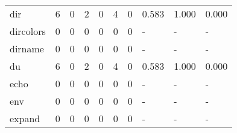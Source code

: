 \begin{longtable}{lp{2.0cm}p{2.0cm}p{2.0cm}p{2.0cm}p{2.0cm}p{2.0cm}p{2.0cm}p{2.0cm}p{2.0cm}}
dir       &                      6 &                                             0 &                                            2 &                                           0 &                                            4 &                                          0 &                                0.583 &                                  1.000 &                                0.000 \\
dircolors &                      0 &                                             0 &                                            0 &                                           0 &                                            0 &                                          0 &                                    - &                                      - &                                    - \\
dirname   &                      0 &                                             0 &                                            0 &                                           0 &                                            0 &                                          0 &                                    - &                                      - &                                    - \\
du        &                      6 &                                             0 &                                            2 &                                           0 &                                            4 &                                          0 &                                0.583 &                                  1.000 &                                0.000 \\
echo      &                      0 &                                             0 &                                            0 &                                           0 &                                            0 &                                          0 &                                    - &                                      - &                                    - \\
env       &                      0 &                                             0 &                                            0 &                                           0 &                                            0 &                                          0 &                                    - &                                      - &                                    - \\
expand    &                      0 &                                             0 &                                            0 &                                           0 &                                            0 &                                          0 &                                    - &                                      - &                                    - \\

\end{longtable}

